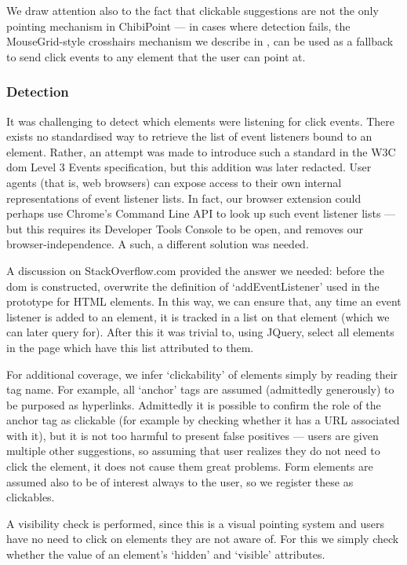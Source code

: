 \documentclass[a4paper, 12pt]{report}
\begin{document}
We draw attention also to the fact that clickable suggestions are not the only pointing mechanism in ChibiPoint --- in cases where detection fails, the MouseGrid-style crosshairs mechanism we describe in , can be used as a fallback to send click events to any element that the user can point at.

\subsubsection{Detection}
It was challenging to detect which elements were listening for click events. There exists no standardised way to retrieve the list of event listeners bound to an element. Rather, an attempt was made to introduce such a standard in the W3C \gls{dom} Level 3 Events specification\cite{dom3attempt}, but this addition was later redacted\cite{domlevel3}. User agents (that is, web browsers) can expose access to their own internal representations of event listener lists. In fact, our browser extension could perhaps use Chrome's Command Line API\cite{commandlineapi} to look up such event listener lists --- but this requires its Developer Tools Console to be open, and removes our browser-independence. A such, a different solution was needed.

A discussion on StackOverflow.com provided the answer we needed\cite{eventlistenerprototype}: before the \gls{dom} is constructed, overwrite the definition of `addEventListener' used in the prototype for HTML elements. In this way, we can ensure that, any time an event listener is added to an element, it is tracked in a list on that element (which we can later query for). After this it was trivial to, using JQuery, select all elements in the page which have this list attributed to them.

For additional coverage, we infer `clickability' of elements simply by reading their tag name. For example, all `anchor' tags are assumed (admittedly generously) to be purposed as hyperlinks. Admittedly it is possible to confirm the role of the anchor tag as clickable (for example by checking whether it has a URL associated with it), but it is not too harmful to present false positives --- users are given multiple other suggestions, so assuming that user realizes they do not need to click the element, it does not cause them great problems. Form elements are assumed also to be of interest always to the user, so we register these as clickables.

A visibility check is performed, since this is a visual pointing system and users have no need to click on elements they are not aware of. For this we simply check whether the value of an element's `hidden' and `visible' attributes.
\end{document}

